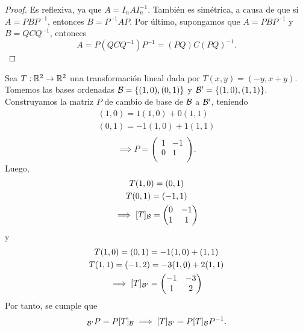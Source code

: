 \documentclass[12pt,a4paper]{book}
\newcommand{\llaves}[1]{\{#1\}}
\begin{document}
    \begin{proof}
        Es reflexiva, ya que $A = I_{n} A I_{n}^{-1}$. También es simétrica, a causa de que si $A = PBP^{-1}$, entonces $B = P^{-1}AP$. Por último, supongamos que $A = PBP^{-1}$ y $B = {QCQ^{-1}}$, entonces
        \begin{equation*}
            A = P(QCQ^{-1})P^{-1} = (PQ)C(PQ)^{-1}.
        \end{equation*}
    \end{proof}

    \vspace{1.2cm}

    \begin{ejemplo}
    \label{ej:35}
        Sea $T:\mathbb{R}^{2} \to \mathbb{R}^{2}$ una transformación lineal dada por $T(x,y) = (-y, x + y)$. Tomemos las bases ordenadas $\BB = \llaves{(1,0), (0, 1)}$ y $\BB' = \llaves{(1, 0), (1, 1)}$.
        Construyamos la matriz $P$ de cambio de base de $\mathcal{B}$ a $\mathcal{B}'$, teniendo
        \begin{gather*}
            (1, 0) = 1(1,0) + 0(1, 1)\\
            (0, 1) = -1(1, 0) + 1(1, 1)\\
        \end{gather*}
        \begin{equation*}
            \implies P =
            \begin{pmatrix}
                1 & -1\\
                0 & 1\\
            \end{pmatrix}.
        \end{equation*}
        Luego,
        \begin{gather*}
            T(1,0) = (0,1)\\
            T(0,1) = (-1,1)\\
            \implies [T]_{\mathcal{B}} =
            \begin{pmatrix}
                0 & -1 \\
                1 & 1
            \end{pmatrix}
        \end{gather*}
        y
        \begin{gather*}
            T(1,0) = (0,1) = -1(1,0) + (1,1)\\
            T(1,1) = (-1, 2) = -3(1, 0) + 2(1, 1)\\
            \implies [T]_{\mathcal{B}'} =
            \begin{pmatrix}
                -1 & -3 \\
                1 & 2 \\
            \end{pmatrix}
        \end{gather*}
        Por tanto, se cumple que
        \begin{equation*}
            [T]_{\BB'}P = P[T]_{\BB} \implies [T]_{\BB'} = P[T]_{\BB}P^{-1}.
        \end{equation*}
    \end{ejemplo}
\end{document}
